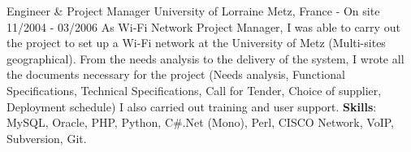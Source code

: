 \begin{cventries}
  \cventry
    {Engineer \& Project Manager} %
    {University of Lorraine} %
    {Metz, France - On site} %
    {11/2004 - 03/2006} %
    {
        As Wi-Fi Network Project Manager, I was able to carry out the project to set up a 
        Wi-Fi network at the University of Metz (Multi-sites geographical). 
        \newline
        From the needs analysis to the delivery of the system, I wrote all the documents 
        necessary for the project (Needs analysis, Functional Specifications, Technical 
        Specifications, Call for Tender, Choice of supplier, Deployment schedule) 
        \newline
        I also carried out training and user support.
        \newline
        \textbf{Skills}: MySQL, Oracle, PHP, Python, C\#.Net (Mono), Perl, CISCO Network,
        VoIP, Subversion, Git.
    }

\end{cventries}